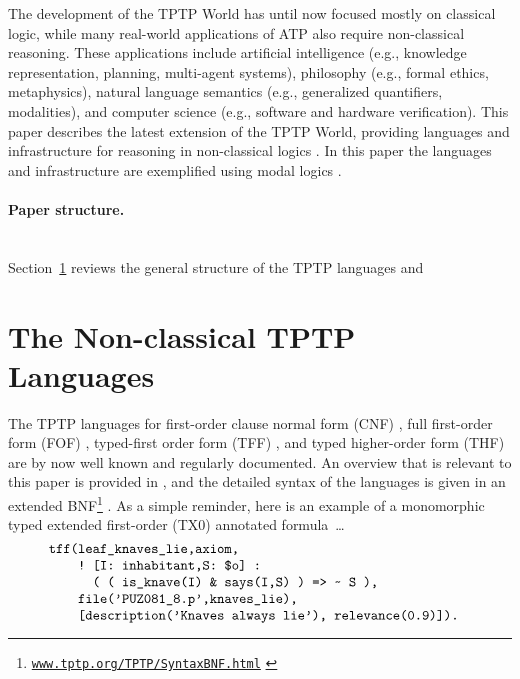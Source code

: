 \documentclass[runningheads]{llncs}
\begin{document}
The development of the TPTP World has until now focused mostly on classical logic, while many 
real-world applications of ATP also require non-classical reasoning. 
These applications include artificial intelligence (e.g., knowledge representation, planning, 
multi-agent systems), philosophy (e.g., formal ethics, metaphysics), natural language semantics 
(e.g., generalized quantifiers, modalities), and computer science (e.g., software and hardware 
verification).
This paper describes the latest extension of the TPTP World, providing languages and
infrastructure for reasoning in non-classical logics \cite{Pri08,Gob01}.
In this paper the languages and infrastructure are exemplified using modal logics \cite{BBW06}.

\paragraph{Paper structure.}~\\
Section~\ref{TPTPLanguages} reviews the general structure of the TPTP languages and

\section{The Non-classical TPTP Languages}
\label{TPTPLanguages}

The TPTP languages for first-order clause normal form (CNF) \cite{SS98-JAR}, full first-order 
form (FOF) \cite{Sut09}, typed-first order form (TFF) \cite{SS+12,BP13-TFF1}, and typed 
higher-order form (THF) \cite{SB10,KSR16} are by now well known and regularly documented.
An overview that is relevant to this paper is provided in \cite{SF+22}, and the detailed
syntax of the languages is given in an extended BNF\footnote{%
\href{https://www.tptp.org/TPTP/SyntaxBNF.html}{\tt www.tptp.org/TPTP/SyntaxBNF.html}
\label{BNF}} \cite{VS06}.
As a simple reminder, here is an example of a monomorphic typed extended first-order (TX0) 
annotated formula~\ldots
\[
\begin{minipage}{\textwidth}
\begin{verbatim}
    tff(leaf_knaves_lie,axiom,
        ! [I: inhabitant,S: $o] : 
          ( ( is_knave(I) & says(I,S) ) => ~ S ),
        file('PUZ081_8.p',knaves_lie),
        [description('Knaves always lie'), relevance(0.9)]).
\end{verbatim}
\end{minipage}
\]
\end{document}
